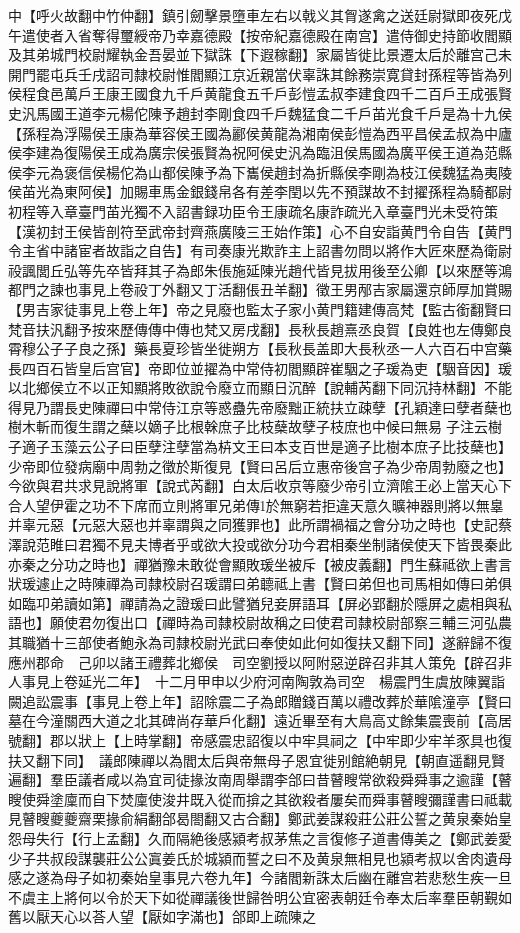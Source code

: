 中【呼火故翻中竹仲翻】鎮引劒擊景墮車左右以戟义其胷遂禽之送廷尉獄即夜死戊午遣使者入省奪得璽綬帝乃幸嘉德殿【按帝紀嘉德殿在南宫】遣侍御史持節收閻顯及其弟城門校尉耀執金吾晏並下獄誅【下遐稼翻】家屬皆徙比景遷太后於離宫己未開門罷屯兵壬戌詔司隸校尉惟閻顯江京近親當伏辜誅其餘務崇寛貸封孫程等皆為列侯程食邑萬戶王康王國食九千戶黄龍食五千戶彭愷孟叔李建食四千二百戶王成張賢史汎馬國王道李元楊佗陳予趙封李剛食四千戶魏猛食二千戶苖光食千戶是為十九侯【孫程為浮陽侯王康為華容侯王國為酈侯黄龍為湘南侯彭愷為西平昌侯孟叔為中廬侯李建為復陽侯王成為廣宗侯張賢為祝阿侯史汎為臨沮侯馬國為廣平侯王道為范縣侯李元為褒信侯楊佗為山都侯陳予為下巂侯趙封為折縣侯李剛為枝江侯魏猛為夷陵侯苖光為東阿侯】加賜車馬金銀錢帛各有差李閏以先不預謀故不封擢孫程為騎都尉初程等入章臺門苖光獨不入詔書録功臣令王康疏名康詐疏光入章臺門光未受符策【漢初封王侯皆剖符至武帝封齊燕廣陵三王始作策】心不自安詣黄門令自告【黄門令主省中諸宦者故詣之自告】有司奏康光欺詐主上詔書勿問以將作大匠來歷為衛尉祋諷閭丘弘等先卒皆拜其子為郎朱倀施延陳光趙代皆見拔用後至公卿【以來歷等鴻都門之諫也事見上卷祋丁外翻又丁活翻倀丑羊翻】徵王男邴吉家屬還京師厚加賞賜【男吉家徒事見上卷上年】帝之見廢也監太子家小黄門籍建傳高梵【監古銜翻賢曰梵音扶汎翻予按來歷傳傳中傳也梵又房戌翻】長秋長趙熹丞良賀【良姓也左傳鄭良霄穆公子子良之孫】藥長夏珍皆坐徙朔方【長秋長盖即大長秋丞一人六百石中宫藥長四百石皆皇后宫官】帝即位並擢為中常侍初閻顯辟崔駰之子瑗為吏【駰音因】瑗以北鄉侯立不以正知顯將敗欲說令廢立而顯日沉醉【說輔芮翻下同沉持林翻】不能得見乃謂長史陳禪曰中常侍江京等惑蠱先帝廢黜正統扶立疎孽【孔穎達曰孽者蘖也樹木斬而復生謂之蘖以嫡子比根榦庶子比枝蘖故孽子枝庶也中候曰無易子注云樹子適子玉藻云公子曰臣孽注孽當為枿文王曰本支百世是適子比樹本庶子比技蘖也】少帝即位發病廟中周勃之徵於斯復見【賢曰呂后立惠帝後宫子為少帝周勃廢之也】今欲與君共求見說將軍【說式芮翻】白太后收京等廢少帝引立濟隂王必上當天心下合人望伊霍之功不下席而立則將軍兄弟傳於無窮若拒違天意久曠神器則將以無辠并辜元惡【元惡大惡也并辜謂與之同獲罪也】此所謂禍福之會分功之時也【史記蔡澤說范睢曰君獨不見夫博者乎或欲大投或欲分功今君相秦坐制諸侯使天下皆畏秦此亦秦之分功之時也】禪猶豫未敢從會顯敗瑗坐被斥【被皮義翻】門生蘇祗欲上書言狀瑗遽止之時陳禪為司隸校尉召瑗謂曰弟聼祗上書【賢曰弟但也司馬相如傳曰弟俱如臨卭弟讀如第】禪請為之證瑗曰此譬猶兒妾屏語耳【屏必郢翻於隱屏之處相與私語也】願使君勿復出口【禪時為司隸校尉故稱之曰使君司隸校尉部察三輔三河弘農其職猶十三部使者鮑永為司隸校尉光武曰奉使如此何如復扶又翻下同】遂辭歸不復應州郡命　己卯以諸王禮葬北鄉侯　司空劉授以阿附惡逆辟召非其人策免【辟召非人事見上卷延光二年】　十二月甲申以少府河南陶敦為司空　楊震門生虞放陳翼詣闕追訟震事【事見上卷上年】詔除震二子為郎贈錢百萬以禮改葬於華隂潼亭【賢曰墓在今潼關西大道之北其碑尚存華戶化翻】遠近畢至有大鳥高丈餘集震喪前【高居號翻】郡以狀上【上時掌翻】帝感震忠詔復以中牢具祠之【中牢即少牢羊豕具也復扶又翻下同】　議郎陳禪以為閻太后與帝無母子恩宜徙别館絶朝見【朝直遥翻見賢遍翻】羣臣議者咸以為宜司徒掾汝南周舉謂李郃曰昔瞽瞍常欲殺舜舜事之逾謹【瞽瞍使舜塗廩而自下焚廩使浚井既入從而揜之其欲殺者屢矣而舜事瞽瞍彌謹書曰祗載見瞽瞍夔夔齋栗掾俞絹翻郃曷閤翻又古合翻】鄭武姜謀殺莊公莊公誓之黄泉秦始皇怨母失行【行上孟翻】久而隔絶後感潁考叔茅焦之言復修子道書傳美之【鄭武姜愛少子共叔段謀襲莊公公寘姜氏於城潁而誓之曰不及黄泉無相見也潁考叔以舍肉遺母感之遂為母子如初秦始皇事見六卷九年】今諸閻新誅太后幽在離宫若悲愁生疾一旦不虞主上將何以令於天下如從禪議後世歸咎明公宜密表朝廷令奉太后率羣臣朝覲如舊以厭天心以荅人望【厭如字滿也】郃即上疏陳之

